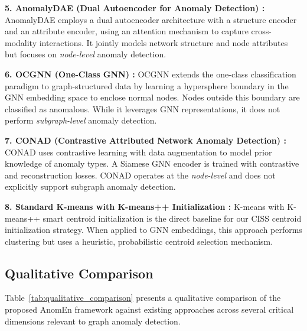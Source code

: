 \textbf{5. AnomalyDAE (Dual Autoencoder for Anomaly Detection) \cite{fan2020anomalydae}:}
AnomalyDAE employs a dual autoencoder architecture with a structure encoder and an attribute encoder, using an attention mechanism to capture cross-modality interactions. It jointly models network structure and node attributes but focuses on \textit{node-level} anomaly detection.

\textbf{6. OCGNN (One-Class GNN) \cite{wang2021ocgnn}:}
OCGNN extends the one-class classification paradigm to graph-structured data by learning a hypersphere boundary in the GNN embedding space to enclose normal nodes. Nodes outside this boundary are classified as anomalous. While it leverages GNN representations, it does not perform \textit{subgraph-level} anomaly detection.

\textbf{7. CONAD (Contrastive Attributed Network Anomaly Detection) \cite{xu2022conad}:}
CONAD uses contrastive learning with data augmentation to model prior knowledge of anomaly types. A Siamese GNN encoder is trained with contrastive and reconstruction losses. CONAD operates at the \textit{node-level} and does not explicitly support subgraph anomaly detection.

\textbf{8. Standard K-means with K-means++ Initialization \cite{arthur2007kmeans}:}
K-means with K-means++ smart centroid initialization is the direct baseline for our CISS centroid initialization strategy. When applied to GNN embeddings, this approach performs clustering but uses a heuristic, probabilistic centroid selection mechanism.

\subsection{Qualitative Comparison}

Table~\ref{tab:qualitative_comparison} presents a qualitative comparison of the proposed AnomEn framework against existing approaches across several critical dimensions relevant to graph anomaly detection.


